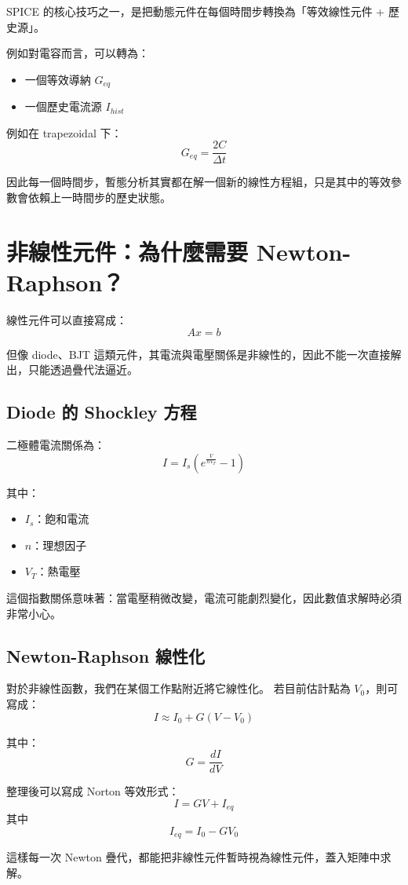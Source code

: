 \documentclass[12pt,a4paper]{article}
\begin{document}
SPICE 的核心技巧之一，是把動態元件在每個時間步轉換為「等效線性元件 + 歷史源」。

例如對電容而言，可以轉為：
\begin{itemize}
\item 一個等效導納 $G_{eq}$
\item 一個歷史電流源 $I_{hist}$
\end{itemize}

例如在 trapezoidal 下：
\[
G_{eq} = \frac{2C}{\Delta t}
\]

因此每一個時間步，暫態分析其實都在解一個新的線性方程組，只是其中的等效參數會依賴上一時間步的歷史狀態。

\section{非線性元件：為什麼需要 Newton-Raphson？}

線性元件可以直接寫成：
\[
A x = b
\]

但像 diode、BJT 這類元件，其電流與電壓關係是非線性的，因此不能一次直接解出，只能透過疊代法逼近。

\subsection{Diode 的 Shockley 方程}

二極體電流關係為：
\[
I = I_s \left(e^{\frac{V}{nV_T}} - 1\right)
\]

其中：
\begin{itemize}
\item $I_s$：飽和電流
\item $n$：理想因子
\item $V_T$：熱電壓
\end{itemize}

這個指數關係意味著：當電壓稍微改變，電流可能劇烈變化，因此數值求解時必須非常小心。

\subsection{Newton-Raphson 線性化}

對於非線性函數，我們在某個工作點附近將它線性化。  
若目前估計點為 $V_0$，則可寫成：
\[
I \approx I_0 + G (V - V_0)
\]

其中：
\[
G = \frac{dI}{dV}
\]

整理後可以寫成 Norton 等效形式：
\[
I = G V + I_{eq}
\]
其中
\[
I_{eq} = I_0 - G V_0
\]

這樣每一次 Newton 疊代，都能把非線性元件暫時視為線性元件，蓋入矩陣中求解。
\end{document}
